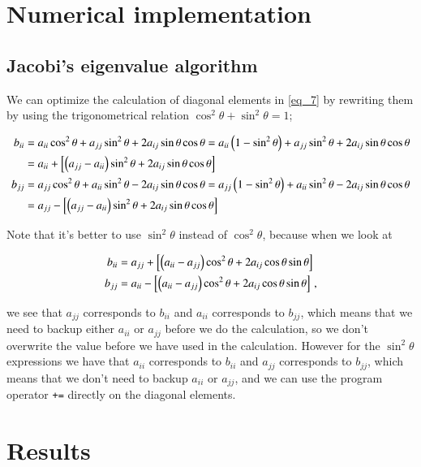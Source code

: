 \documentclass[11pt,english,a4paper]{article}
\begin{document}
\begin{flushleft}
\section{Numerical implementation}

\subsection{Jacobi's eigenvalue algorithm}

We can optimize the calculation of diagonal elements in \eqref{eq_7} by rewriting them by using the trigonometrical relation $\cos^2\theta+\sin^2\theta = 1$;

\begin{align}
b_{ii} &= a_{ii}\cos^2\theta + a_{jj}\sin^2\theta + 2 a_{ij}\sin\theta\cos\theta 
= a_{ii}\left({1-\sin^2\theta}\right) + a_{jj}\sin^2\theta + 2 a_{ij}\sin\theta\cos\theta
\nonumber\\
&= a_{ii} + \left[{\left({a_{jj}-a_{ii}}\right)\sin^2\theta + 2 a_{ij}\sin\theta\cos\theta}\right]
\\
b_{jj} &= a_{jj}\cos^2\theta + a_{ii}\sin^2\theta - 2a_{ij}\sin\theta\cos\theta
= a_{jj}\left({1-\sin^2\theta}\right) + a_{ii}\sin^2\theta - 2a_{ij}\sin\theta\cos\theta
\nonumber\\
&= a_{jj} - \left[{\left({a_{jj}-a_{ii}}\right)\sin^2\theta + 2a_{ij}\sin\theta\cos\theta}\right]
\end{align}

Note that it's better to use $\sin^2\theta$ instead of $\cos^2\theta$, because when we look at 

\begin{align*}
b_{ii} &= a_{jj} + \left[{\left({a_{ii}-a_{jj}}\right)\cos^2\theta + 2a_{ij}\cos\theta\sin\theta}\right]
\\
b_{jj} &= a_{ii} - \left[{\left({a_{ii}-a_{jj}}\right)\cos^2\theta + 2a_{ij}\cos\theta\sin\theta}\right] \,,
\end{align*}

we see that $a_{jj}$ corresponds to $b_{ii}$ and $a_{ii}$ corresponds to $b_{jj}$, which means that we need to backup either $a_{ii}$ or $a_{jj}$ before we do the calculation, so we don't overwrite the value before we have used in the calculation. However for the $\sin^2\theta$ expressions we have that $a_{ii}$ corresponds to $b_{ii}$ and $a_{jj}$ corresponds to $b_{jj}$, which means that we don't need to backup $a_{ii}$ or $a_{jj}$, and we can  use the program operator \texttt{+=} directly on the diagonal elements. 

\section{Results}


\end{flushleft}
\end{document}
